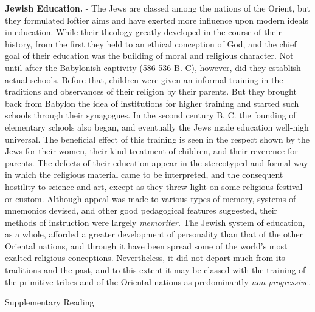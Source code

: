 \documentclass[]{book}
\begin{document}
\textbf{Jewish Education.} - The Jews are classed among the nations of the Orient, but they formulated loftier aims and have exerted more influence upon modern ideals in education. While their theology greatly developed in the course of their history, from the first they held to an ethical conception of God, and the chief goal of their education was the building of moral and religious character. Not until after the Babylonish captivity (586-536 B. C), however, did they establish actual schools. Before that, children were given an informal training in the traditions and observances of their religion by their parents. But they brought back from Babylon the idea of institutions for higher training and started such schools through their synagogues. In the second century B. C. the founding of elementary schools also began, and eventually the Jews made education well-nigh universal. The beneficial effect of this training is seen in the respect shown by the Jews for their women, their kind treatment of children, and their reverence for parents. The defects of their education appear in the stereotyped and formal way in which the religious material came to be interpreted, and the consequent hostility to science and art, except as they threw light on some religious festival or custom. Although appeal was made to various types of memory, systems of mnemonics devised, and other good pedagogical features suggested, their methods of instruction were largely \emph{memoriter.} The Jewish system of education, as a whole, afforded a greater development of personality than that of the other Oriental nations, and through it have been spread some of the world's most exalted religious conceptions. Nevertheless, it did not depart much from its traditions and the past, and to this extent it may be classed with the training of the primitive tribes and of the Oriental nations as predominantly \emph{non-progressive.}

Supplementary Reading
\end{document}
